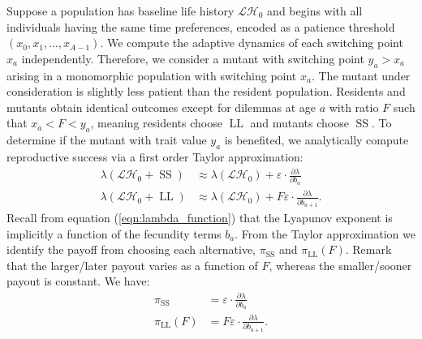 \documentclass[titlepage, hidelinks, 12pt]{article}
\theoremstyle{plain}
\theoremstyle{remark}
\theoremstyle{definition}
\newcommand{\varSS}{\frac{\partial \lambda}{ \partial b_{a}}}
\newcommand{\varLL}{\frac{\partial \lambda}{ \partial b_{a+1}}}
\newcommand{\LH}{\mathcal{LH}}
\DeclareMathOperator{\smallersooner}{SS}
\DeclareMathOperator{\largerlater}{LL}
\begin{document}
Suppose a population has baseline life history $\LH_0$ and begins with all individuals having the same time preferences,
encoded as a patience threshold $(x_0, x_1, \ldots, x_{A-1})$. We compute the adaptive dynamics of each switching point
$x_a$ independently. Therefore, we consider a mutant with switching point $y_a > x_a$ arising in a monomorphic population with switching point $x_a$.  
The mutant under consideration is slightly less patient than the resident population. Residents and mutants obtain identical outcomes except for dilemmas
at age $a$ with ratio $F$ such that $x_a < F < y_a$, meaning residents choose $\largerlater$ and mutants choose $\smallersooner$. 
To determine if the mutant with trait value $y_a$ is benefited, we analytically compute reproductive success via a first order Taylor approximation:
\begin{align}
    \lambda(\LH_0 + \smallersooner) &\approx \lambda(\LH_0) + \varepsilon \cdot \varSS \\
    \lambda(\LH_0 + \largerlater) &\approx \lambda(\LH_0) + F\varepsilon \cdot \varLL.
\end{align}
Recall from equation (\ref{eqn:lambda_function}) that the Lyapunov exponent is implicitly a function of the fecundity terms $b_a$. 
From the Taylor approximation we identify the payoff from choosing each alternative, 
$\pi_{\smallersooner}$ and $\pi_{\largerlater}(F)$. Remark that the larger/later payout
varies as a function of $F$, whereas the smaller/sooner payout is constant. We have: 
\begin{align}
    \pi_{\smallersooner} &= \varepsilon\cdot \varSS \label{eqn:varss} \\ 
    \pi_{\largerlater}(F) &= F\varepsilon\cdot \varLL. \label{eqn:varll}
\end{align}
\end{document}
